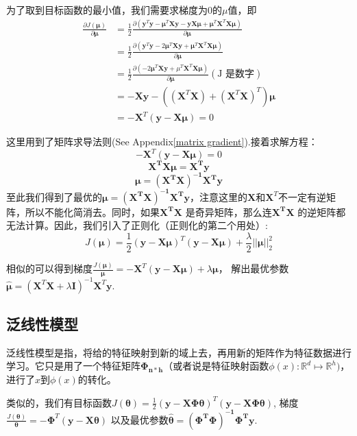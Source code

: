 为了取到目标函数的最小值，我们需要求梯度为$0$的$\mu$值，即
\begin{equation}
\nonumber
  \begin{aligned}
    \frac{\partial J(\mathbf{\mu})}{\partial \mathbf \mu} &
    = \frac{1}{2}\frac{\partial (\mathbf y^T\mathbf y -\mathbf \mu^T\mathbf X\mathbf y - \mathbf y\mathbf X\mathbf \mu +\mathbf \mu^T\mathbf X^T\mathbf X\mathbf \mu)}{\partial \mathbf \mu} \\
    & = \frac{1}{2}\frac{\partial (\mathbf y^T\mathbf y -2\mathbf \mu^T\mathbf X\mathbf y+\mathbf \mu^T\mathbf X^T\mathbf X\mathbf \mu)}{\partial \mathbf \mu} \\
    & = \frac{1}{2} \frac{\partial (-2\mathbf \mu^T\mathbf X\mathbf y+\mu^T\mathbf X^T\mathbf X\mathbf \mu)}{\partial \mathbf \mu} (\text{J 是数字})\\
    & = -\mathbf X\mathbf y - ((\mathbf X^T\mathbf X)+(\mathbf X^T\mathbf X)^T)\mathbf \mu\\
    & = -\mathbf X^T(\mathbf y - \mathbf X\mathbf \mu)  = 0
  \end{aligned}
\end{equation}

这里用到了矩阵求导法则(See Appendix\ref{matrix gradient}).接着求解方程：
$$-\mathbf X^T(\mathbf y-\mathbf X\mathbf \mu) = 0$$
$$\mathbf{X^TX\mu} = \mathbf{X^Ty}$$
$$\mathbf \mu =\mathbf{ (X^TX)^{-1}X^Ty}$$
至此我们得到了最优的$\mathbf \mu =\mathbf{ (X^TX)^{-1}X^Ty}$，注意这里的$\mathbf X$和$\mathbf X^T$不一定有逆矩阵，所以不能化简消去。同时，如果$\mathbf{X^TX}$ 是奇异矩阵，那么连$\mathbf{X^TX}$ 的逆矩阵都无法计算。因此，我们引入了正则化（正则化的第二个用处）:
$$J(\mathbf \mu) = \frac{1}{2}(\mathbf y-\mathbf X\mathbf \mu)^T(\mathbf y - \mathbf X\mathbf \mu) + \frac{\lambda}{2}||\mathbf \mu||_2^2 $$

相似的可以得到梯度$\displaystyle \frac{J(\mathbf \mu)}{\mathbf \mu} = -\mathbf X^T(\mathbf y-\mathbf X\mathbf \mu) + \lambda \mathbf \mu$，
解出最优参数$\hat{\mathbf \mu} = (\mathbf X^T\mathbf X+\lambda\mathbf I)^{-1}\mathbf X^T\mathbf y$.

\subsection{泛线性模型}
泛线性模型是指，将给的特征映射到新的域上去，再用新的矩阵作为特征数据进行学习。它只是用了一个特征矩阵$\mathbf{\Phi_{n*h}}$（或者说是特征映射函数$\phi(x):\mathbb R^d \mapsto \mathbb R^h)$，进行了$x$到$\phi(x)$的转化。

类似的，我们有目标函数$J(\mathbf \theta) = \frac{1}{2}(\mathbf y-\mathbf X\mathbf \Phi\mathbf\theta)^T(\mathbf y - \mathbf X\mathbf\Phi\mathbf\theta)$,
梯度$\displaystyle \frac{J(\mathbf \theta)}{\mathbf \theta} = -\mathbf \Phi^T(\mathbf y-\mathbf X\mathbf \theta)$
以及最优参数$\mathbf{\hat\theta} = \mathbf{(\Phi^T\Phi)^{-1}\Phi^T y}$.

